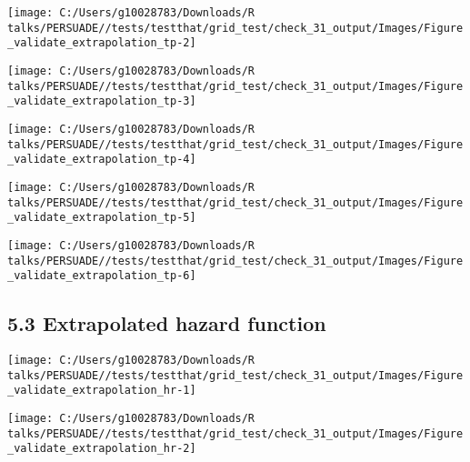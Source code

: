 \documentclass[
]{article}
\begin{document}
\begin{flushleft}\texttt{[image: C:/Users/g10028783/Downloads/R talks/PERSUADE//tests/testthat/grid\_test/check\_31\_output/Images/Figure\_validate\_extrapolation\_tp-2]} \end{flushleft}

\begin{flushleft}\texttt{[image: C:/Users/g10028783/Downloads/R talks/PERSUADE//tests/testthat/grid\_test/check\_31\_output/Images/Figure\_validate\_extrapolation\_tp-3]} \end{flushleft}

\begin{flushleft}\texttt{[image: C:/Users/g10028783/Downloads/R talks/PERSUADE//tests/testthat/grid\_test/check\_31\_output/Images/Figure\_validate\_extrapolation\_tp-4]} \end{flushleft}

\begin{flushleft}\texttt{[image: C:/Users/g10028783/Downloads/R talks/PERSUADE//tests/testthat/grid\_test/check\_31\_output/Images/Figure\_validate\_extrapolation\_tp-5]} \end{flushleft}

\begin{flushleft}\texttt{[image: C:/Users/g10028783/Downloads/R talks/PERSUADE//tests/testthat/grid\_test/check\_31\_output/Images/Figure\_validate\_extrapolation\_tp-6]} \end{flushleft}

\clearpage

\subsection{5.3 Extrapolated hazard
function}\label{extrapolated-hazard-function}

\begin{flushleft}\texttt{[image: C:/Users/g10028783/Downloads/R talks/PERSUADE//tests/testthat/grid\_test/check\_31\_output/Images/Figure\_validate\_extrapolation\_hr-1]} \end{flushleft}

\begin{flushleft}\texttt{[image: C:/Users/g10028783/Downloads/R talks/PERSUADE//tests/testthat/grid\_test/check\_31\_output/Images/Figure\_validate\_extrapolation\_hr-2]} \end{flushleft}
\end{document}
